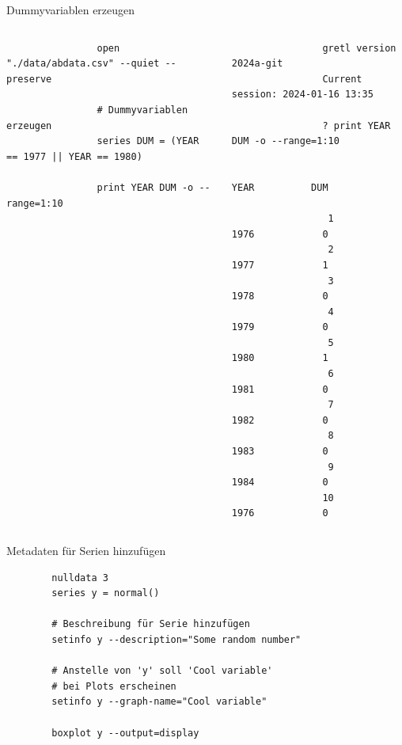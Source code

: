 \documentclass{beamer}[11pt]
\begin{document}
\begin{frame}[fragile]{Dummyvariablen erzeugen}
	\begin{columns}[T] %
		\scriptsize
		\begin{column}{.62\textwidth}
			\begin{verbatim}
				open "./data/abdata.csv" --quiet --preserve

				# Dummyvariablen erzeugen
				series DUM = (YEAR == 1977 || YEAR == 1980)

				print YEAR DUM -o --range=1:10
			\end{verbatim}
		\end{column}

		\begin{column}{.4\textwidth}
			\tiny
			\begin{verbatim}
				gretl version 2024a-git
				Current session: 2024-01-16 13:35

				? print YEAR DUM -o --range=1:10

				            YEAR          DUM

				 1         1976            0
				 2         1977            1
				 3         1978            0
				 4         1979            0
				 5         1980            1
				 6         1981            0
				 7         1982            0
				 8         1983            0
				 9         1984            0
				10         1976            0
			\end{verbatim}
	  \end{column}
	\end{columns}
\end{frame}

\begin{frame}[fragile]{Metadaten für Serien hinzufügen}
	\begin{verbatim}
		nulldata 3
		series y = normal()

		# Beschreibung für Serie hinzufügen
		setinfo y --description="Some random number"

		# Anstelle von 'y' soll 'Cool variable'
		# bei Plots erscheinen
		setinfo y --graph-name="Cool variable"

		boxplot y --output=display
	\end{verbatim}
\end{frame}
\end{document}
